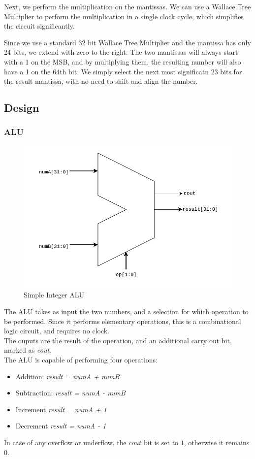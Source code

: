 \documentclass[a4paper,10pt]{article}
\begin{document}
    Next, we perform the multiplication on the mantissas. We can use a Wallace Tree Multiplier to perform the multiplication in a single clock cycle, which simplifies the circuit significantly.

    Since we use a standard 32 bit Wallace Tree Multiplier and the mantissa has only 24 bits, we extend with zero to the right. The two mantissas will always start with a 1 on the MSB, and by multiplying them, the resulting number will also have a 1 on the 64th bit. We simply select the next most significatn 23 bits for the result mantissa, with no need to shift and align the number.


    \subsection{Design}
    \subsubsection{ALU}
    \begin{figure}[h]
     \centering
     \caption{Simple Integer ALU}
     \includegraphics[scale=0.75]{adderALU.pdf}
    \end{figure}

    The ALU takes as input the two numbers, and a selection for which operation to be performed. Since it performs elementary operations, this is a combinational logic circuit, and requires no clock.\\
    The ouputs are the result of the operation, and an additional carry out bit, marked as \textit{cout}.\\
    The ALU is capable of performing four operations:
    \begin{itemize}
     \item Addition: \textit{result = numA + numB}
     \item Subtraction: \textit{result = numA - numB}
     \item Increment \textit{result = numA + 1}
     \item Decrement \textit{result = numA - 1}
    \end{itemize}
    In case of any overflow or underflow, the $cout$ bit is set to $1$, otherwise it remains $0$.
\end{document}
